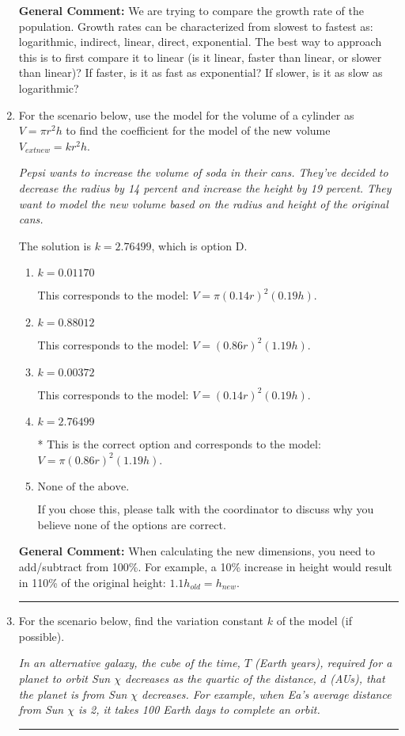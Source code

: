 \documentclass{extbook}[14pt]
\newcommand{\litem}[1]{\item #1

\rule{\textwidth}{0.4pt}}
\begin{document}
\begin{enumerate}
{\textbf{General Comment:} We are trying to compare the growth rate of the population. Growth rates can be characterized from slowest to fastest as: logarithmic, indirect, linear, direct, exponential. The best way to approach this is to first compare it to linear (is it linear, faster than linear, or slower than linear)? If faster, is it as fast as exponential? If slower, is it as slow as logarithmic?
}
\litem{
For the scenario below, use the model for the volume of a cylinder as $V = \pi r^2 h$ to find the coefficient for the model of the new volume $V_{	ext{new}} = k r^2 h$.

\begin{center}
    \textit{ Pepsi wants to increase the volume of soda in their cans. They've decided to decrease the radius by 14 percent and increase the height by 19 percent. They want to model the new volume based on the radius and height of the original cans. }
\end{center}


The solution is \( k = 2.76499 \), which is option D.\begin{enumerate}[label=\Alph*.]
\item \( k = 0.01170 \)

This corresponds to the model: $V = \pi (0.14 r)^2 (0.19 h)$.
\item \( k = 0.88012 \)

This corresponds to the model: $V = (0.86 r)^2 (1.19 h)$.
\item \( k = 0.00372 \)

This corresponds to the model: $V = (0.14 r)^2 (0.19 h)$.
\item \( k = 2.76499 \)

* This is the correct option and corresponds to the model: $V = \pi (0.86 r)^2 (1.19 h)$.
\item \( \text{None of the above.} \)

If you chose this, please talk with the coordinator to discuss why you believe none of the options are correct.
\end{enumerate}

\textbf{General Comment:} When calculating the new dimensions, you need to add/subtract from 100\%. For example, a 10\% increase in height would result in 110\% of the original height: $1.1h_{old} = h_{new}$.
}
\litem{
For the scenario below, find the variation constant $k$ of the model (if possible).

\begin{center}
    \textit{ In an alternative galaxy, the cube of the time, $T$ (Earth years), required for a planet to orbit Sun $\chi$ decreases as the quartic of the distance, $d$ (AUs), that the planet is from Sun $\chi$ decreases. For example, when Ea's average distance from Sun $\chi$ is 2, it takes 100 Earth days to complete an orbit. }
\end{center}


}
\end{enumerate}
\end{document}
